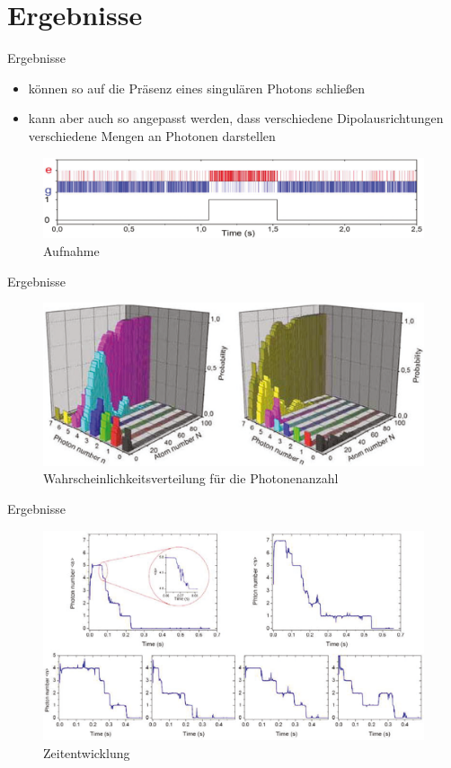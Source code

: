 \documentclass{beamer}
\begin{document}
\section{Ergebnisse}
\begin{frame}{Ergebnisse}
    \begin{itemize}
      \item können so auf die Präsenz eines singulären Photons schließen
      \item kann aber auch so angepasst werden, dass verschiedene Dipolausrichtungen verschiedene Mengen an Photonen darstellen
    \end{itemize}
			\begin{figure}
				\center\includegraphics[width=1\textwidth]{detection.png}
				\caption{Aufnahme\cite{lect}}
			\end{figure}
\end{frame}
\begin{frame}{Ergebnisse}
			\begin{figure}
				\center\includegraphics[width=1\textwidth]{multdet.png}
				\caption{Wahrscheinlichkeitsverteilung für die Photonenanzahl\cite{lect}}
			\end{figure}
\end{frame}
\begin{frame}{Ergebnisse}
			\begin{figure}
				\center\includegraphics[width=1\textwidth]{timeevol.png}
				\caption{Zeitentwicklung\cite{lect}}
			\end{figure}
\end{frame}
\end{document}
